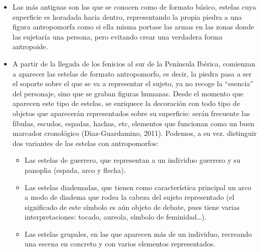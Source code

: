 \documentclass[
]{article}
\providecommand{\tightlist}{%
  \setlength{\itemsep}{0pt}\setlength{\parskip}{0pt}}
\begin{document}
\begin{itemize}
\tightlist
\item
  Las más antiguas son las que se conocen como de formato básico,
  estelas cuya superficie es horadada hacia dentro, representando la
  propia piedra a una figura antropomorfa como si ella misma portase las
  armas en las zonas donde las sujetaría una persona, pero evitando
  crear una verdadera forma antropoide.
\item
  A partir de la llegada de los fenicios al sur de la Península Ibérica,
  comienzan a aparecer las estelas de formato antropomorfo, es decir, la
  piedra pasa a ser el soporte sobre el que se va a representar el
  sujeto, ya no recoge la ``esencia'' del personaje, sino que se graban
  figuras humanas. Desde el momento que aparecen este tipo de estelas,
  se enriquece la decoración con todo tipo de objetos que aparecerán
  representados sobre su superficie: serán frecuente las fíbulas,
  escudos, espadas, hachas, etc, elementos que funcionan como un buen
  marcador cronológico (Diaz-Guardamino, 2011). Podemos, a su vez.
  distinguir dos variantes de las estelas con antropomorfos:

  \begin{itemize}
  \tightlist
  \item
    Las estelas de guerrero, que representan a un individuo guerrero y
    su panoplia (espada, arco y flecha).
  \item
    Las estelas diademadas, que tienen como característica principal un
    arco a modo de diadema que rodea la cabeza del sujeto representado
    (el significado de este símbolo es aún objeto de debate, pues tiene
    varias interpretaciones: tocado, aureola, símbolo de
    feminidad\ldots).
  \item
    Las estelas grupales, en las que aparecen más de un individuo,
    recreando una escena en concreto y con varios elementos
    representados.
  \end{itemize}
\end{itemize}
\end{document}
